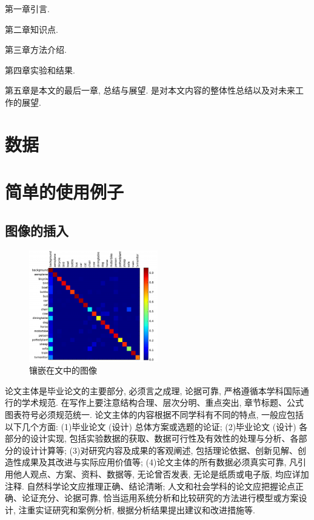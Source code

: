 \documentclass[a4paper]{article}
\begin{document}
\begin{spacing}{1.5}
第一章引言.

第二章知识点.

第三章方法介绍.

第四章实验和结果.

第五章是本文的最后一章, 总结与展望. 是对本文内容的整体性总结以及对未来工作的展望.

\pagebreak[4]


\section{数据}

\section{简单的使用例子}
\label{cha:example}
\subsection{图像的插入}
\label{sec:Images}
\begin{figure}
\centering
\includegraphics[width=0.5\textwidth]{images/Chap2/confusion.pdf} %
\caption{镶嵌在文中的图像}
\label{fig:confusion}
\end{figure}
论文主体是毕业论文的主要部分, 必须言之成理, 论据可靠, 严格遵循本学科国际通行的学术规范. 在写作上要注意结构合理、层次分明、重点突出, 章节标题、公式图表符号必须规范统一. 论文主体的内容根据不同学科有不同的特点, 一般应包括以下几个方面: (1)毕业论文 (设计) 总体方案或选题的论证; (2)毕业论文 (设计) 各部分的设计实现, 包括实验数据的获取、数据可行性及有效性的处理与分析、各部分的设计计算等; (3)对研究内容及成果的客观阐述, 包括理论依据、创新见解、创造性成果及其改进与实际应用价值等; (4)论文主体的所有数据必须真实可靠, 凡引用他人观点、方案、资料、数据等, 无论曾否发表, 无论是纸质或电子版, 均应详加注释. 自然科学论文应推理正确、结论清晰; 人文和社会学科的论文应把握论点正确、论证充分、论据可靠, 恰当运用系统分析和比较研究的方法进行模型或方案设计, 注重实证研究和案例分析, 根据分析结果提出建议和改进措施等.


\end{spacing}
\end{document}

